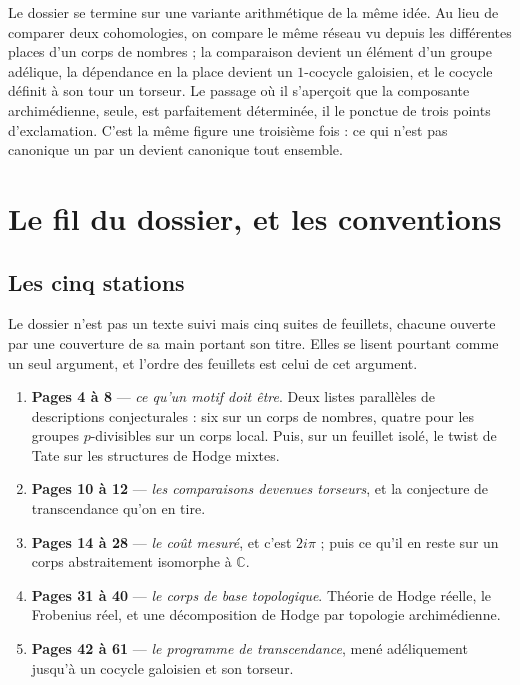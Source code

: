 \documentclass[11pt,a4paper]{article}
\begin{document}
\begin{resume}
Le dossier se termine sur une variante arithmétique de la même idée. Au lieu de
comparer deux cohomologies, on compare le même réseau vu depuis les différentes
places d'un corps de nombres ; la comparaison devient un élément d'un groupe
adélique, la dépendance en la place devient un $1$-cocycle galoisien, et le
cocycle définit à son tour un torseur. Le passage où il s'aperçoit que la
composante archimédienne, seule, est parfaitement déterminée, il le ponctue de
trois points d'exclamation. C'est la même figure une troisième fois : ce qui
n'est pas canonique un par un devient canonique tout ensemble.

\end{resume}

\section*{Le fil du dossier, et les conventions}

\subsection*{Les cinq stations}

Le dossier n'est pas un texte suivi mais cinq suites de feuillets, chacune
ouverte par une couverture de sa main portant son titre. Elles se lisent
pourtant comme un seul argument, et l'ordre des feuillets est celui de cet
argument.

\begin{enumerate}
  \item \textbf{Pages 4 à 8} — \emph{ce qu'un motif doit être}. Deux listes
        parallèles de descriptions conjecturales : six sur un corps de nombres,
        quatre pour les groupes $p$-divisibles sur un corps local. Puis, sur un
        feuillet isolé, le twist de Tate sur les structures de Hodge mixtes.
  \item \textbf{Pages 10 à 12} — \emph{les comparaisons devenues torseurs}, et
        la conjecture de transcendance qu'on en tire.
  \item \textbf{Pages 14 à 28} — \emph{le coût mesuré}, et c'est $2i\pi$ ;
        puis ce qu'il en reste sur un corps abstraitement isomorphe à
        $\mathbb{C}$.
  \item \textbf{Pages 31 à 40} — \emph{le corps de base topologique}. Théorie
        de Hodge réelle, le Frobenius réel, et une décomposition de Hodge par
        topologie archimédienne.
  \item \textbf{Pages 42 à 61} — \emph{le programme de transcendance}, mené
        adéliquement jusqu'à un cocycle galoisien et son torseur.
\end{enumerate}
\end{document}
